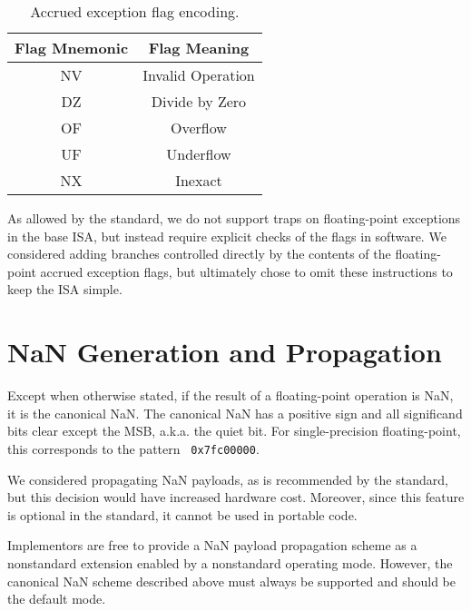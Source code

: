 \begin{table}[htp]
\begin{small}
\begin{center}
\begin{tabular}{cl}
\hline
\multicolumn{1}{|c|}{Flag Mnemonic} &
\multicolumn{1}{c|}{Flag Meaning} \\
\hline
\multicolumn{1}{|c|}{NV} &
\multicolumn{1}{c|}{Invalid Operation}\\
\hline
\multicolumn{1}{|c|}{DZ} &
\multicolumn{1}{c|}{Divide by Zero}\\
\hline
\multicolumn{1}{|c|}{OF} &
\multicolumn{1}{c|}{Overflow}\\
\hline
\multicolumn{1}{|c|}{UF} &
\multicolumn{1}{c|}{Underflow}\\
\hline
\multicolumn{1}{|c|}{NX} &
\multicolumn{1}{c|}{Inexact}\\
\hline
\end{tabular}
\end{center}
\end{small}
\caption{Accrued exception flag encoding.}
\label{bitdef}
\end{table}

\begin{commentary}
As allowed by the standard, we do not support traps on floating-point
exceptions in the base ISA, but instead require explicit checks of the flags
in software.  We considered adding branches controlled directly by the
contents of the floating-point accrued exception flags, but ultimately chose
to omit these instructions to keep the ISA simple.
\end{commentary}

\section{NaN Generation and Propagation}

Except when otherwise stated, if the result of a floating-point operation is
NaN, it is the canonical NaN.  The canonical NaN has a positive sign and all
significand bits clear except the MSB, a.k.a. the quiet bit.  For
single-precision floating-point, this corresponds to the pattern {\tt
0x7fc00000}.

\begin{commentary}
We considered propagating NaN payloads, as is recommended by the standard,
but this decision would have increased hardware cost.  Moreover, since this
feature is optional in the standard, it cannot be used in portable code.

Implementors are free to provide a NaN payload propagation scheme as
a nonstandard extension enabled by a nonstandard operating mode.  However, the
canonical NaN scheme described above must always be supported and should be
the default mode.
\end{commentary}

